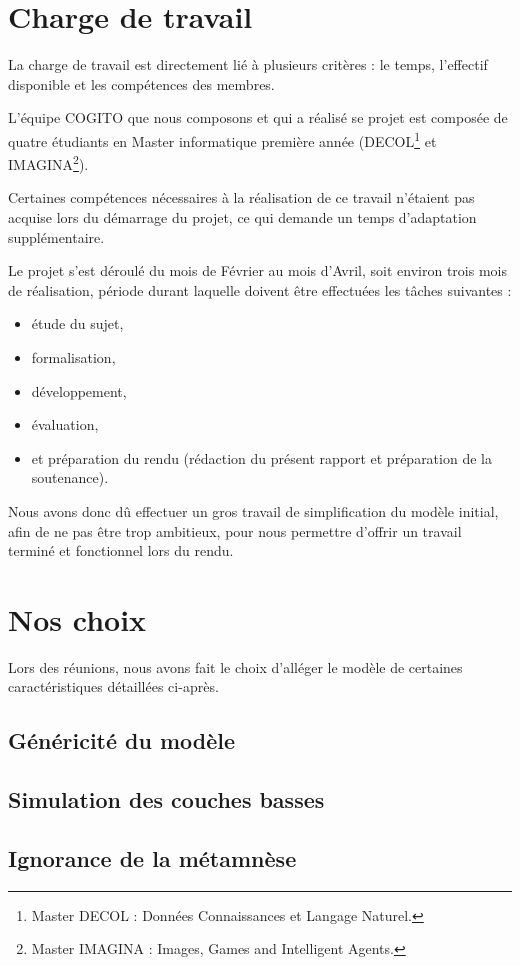 \section{Charge de travail}
La charge de travail est directement lié à plusieurs critères : le temps, l'effectif disponible et les compétences des membres.

L'équipe COGITO que nous composons et qui a réalisé se projet est composée de quatre étudiants en Master informatique première année (DECOL\footnote{Master DECOL : Données Connaissances et Langage Naturel.} et IMAGINA\footnote{Master IMAGINA : Images, Games and Intelligent Agents.}).

Certaines compétences nécessaires à la réalisation de ce travail n'étaient pas acquise lors du démarrage du projet, ce qui demande un temps d'adaptation supplémentaire.

Le projet s'est déroulé du mois de Février au mois d'Avril, soit environ trois mois de réalisation, période durant laquelle doivent être effectuées les tâches suivantes :

\begin{itemize}
\item étude du sujet, 
\item formalisation, 
\item développement, 
\item évaluation,
\item et préparation du rendu (rédaction du présent rapport et préparation de la soutenance).
\end{itemize}

Nous avons donc dû effectuer un gros travail de simplification du modèle initial, afin de ne pas être trop ambitieux, pour nous permettre d'offrir un travail terminé et fonctionnel lors du rendu.

\section{Nos choix}

Lors des réunions, nous avons fait le choix d'alléger le modèle de certaines caractéristiques détaillées ci-après.

\subsection{Généricité du modèle}
\subsection{Simulation des couches basses}
\subsection{Ignorance de la métamnèse}